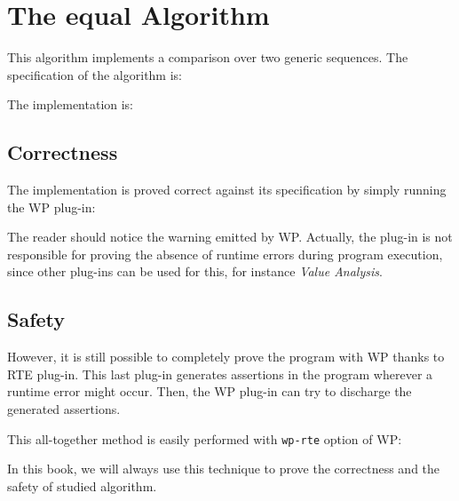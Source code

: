 \section{The \textsf{equal} Algorithm}
\label{equal}

This algorithm implements a comparison over two generic sequences.
The specification of the algorithm is:


The implementation is:


\clearpage
\subsection{Correctness}

The implementation is proved correct against its specification by
simply running the \textsf{WP} plug-in: 

The reader should notice the warning emitted by \textsf{WP}. Actually,
the plug-in is not responsible for proving the absence of runtime
errors during program execution, since other plug-ins can be used
for this, for instance \emph{Value Analysis}.

\subsection{Safety}

However, it is still possible to completely prove the program with
\textsf{WP} thanks to \textsf{RTE} plug-in. This last plug-in
generates assertions in the program wherever a runtime error might
occur. Then, the \textsf{WP} plug-in can try to discharge the
generated assertions.

This all-together method is easily performed with \texttt{wp-rte}
option of \textsf{WP}:

In this book, we will always use this technique to prove the
correctness and the safety of studied algorithm.
